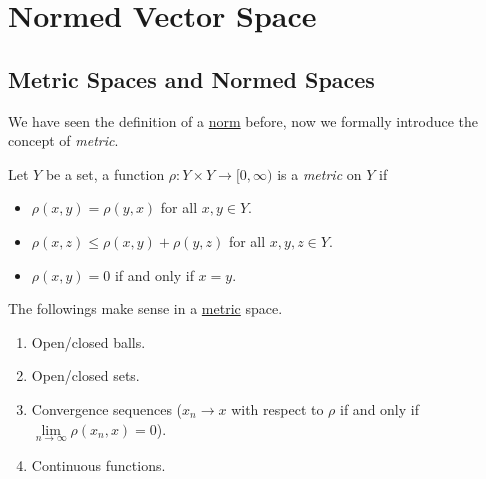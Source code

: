 \chapter{Normed Vector Space}
\section{Metric Spaces and Normed Spaces}
We have seen the definition of a \hyperref[def:norm]{norm} before, now we formally introduce the concept of \emph{metric}.
\begin{definition}[Metric]\label{def:metric}
	Let \(Y\) be a set, a function \(\rho \colon Y\times Y\to [0, \infty )\) is a \emph{metric} on \(Y\) if
	\begin{itemize}
		\item \(\rho (x, y) = \rho (y, x)\) for all \(x, y\in Y\).
		\item \(\rho (x, z) \leq \rho (x, y) + \rho (y, z)\) for all \(x, y, z\in Y\).
		\item \(\rho (x, y) = 0\) if and only if \(x = y\).
	\end{itemize}
\end{definition}

\begin{note}
	The followings make sense in a \hyperref[def:metric]{metric} space.
	\begin{enumerate}
		\item Open/closed balls.
		\item Open/closed sets.
		\item Convergence sequences (\(x_{n} \to x\) with respect to \(\rho \) if and only if \(\lim\limits_{n \to \infty} \rho (x_{n} , x) = 0\)).
		\item Continuous functions.
	\end{enumerate}
\end{note}

